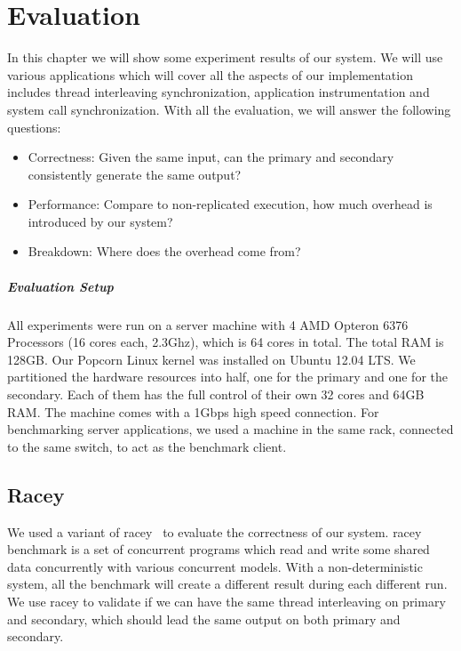\chapter{Evaluation}

In this chapter we will show some experiment results of our system. We will use various applications which will cover all the aspects of our implementation includes thread interleaving synchronization, application instrumentation and system call synchronization. With all the evaluation, we will answer the following questions:

\begin{itemize}
  \item Correctness: Given the same input, can the primary and secondary consistently generate the same output?
  \item Performance: Compare to non-replicated execution, how much overhead is introduced by our system?
  \item Breakdown: Where does the overhead come from?
\end{itemize}

\paragraph{Evaluation Setup} All experiments were run on a server machine with 4 AMD Opteron 6376 Processors (16 cores each, 2.3Ghz), which is 64 cores in total. The total RAM is 128GB. Our Popcorn Linux kernel was installed on Ubuntu 12.04 LTS. We partitioned the hardware resources into half, one for the primary and one for the secondary. Each of them has the full control of their own 32 cores and 64GB RAM. The machine comes with a 1Gbps high speed connection. For benchmarking server applications, we used a machine in the same rack, connected to the same switch, to act as the benchmark client.

\section{Racey}
We used a variant of racey~\cite{hillstress} to evaluate the correctness of our system. racey benchmark is a set of concurrent programs which read and write some shared data concurrently with various concurrent models. With a non-deterministic system, all the benchmark will create a different result during each different run. We use racey to validate if we can have the same thread interleaving on primary and secondary, which should lead the same output on both primary and secondary.

